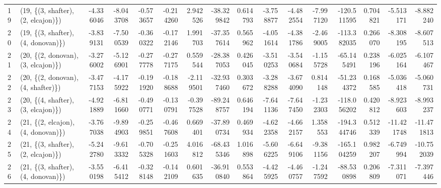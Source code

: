 \begin{tabular}{llrrrrrrrrrrrrrr}
19 &  (19, \{(3, shafter), (2, elcajon)\}) & -4.336046 &  -8.043708 &  -0.573657 & -0.214260 &  2.942526 &  -38.329842 &  0.614793 &  -3.758877 &  -4.482554 & -7.997120 & -120.511595 &  0.704821 &  -5.513171 &  -8.882240 \\
20 &  (19, \{(3, shafter), (4, donovan)\}) & -3.839131 &  -7.500539 &  -0.360322 & -0.172146 &  1.991703 &  -37.357614 &  0.565962 &  -4.051614 &  -4.381786 & -2.469005 & -113.382035 &  0.266070 &  -8.308195 &  -8.607513 \\
21 &  (20, \{(2, donovan), (3, elcajon)\}) & -3.276002 &  -5.126901 &  -0.277778 & -0.277175 &  0.559544 &  -28.387053 &  0.426045 &  -3.510253 &  -3.540684 & -1.155728 &  -65.145491 &  0.238196 &  -6.025164 &  -6.107467 \\
22 &  (20, \{(2, donovan), (4, shafter)\}) & -3.477153 &  -4.175922 &  -0.191920 & -0.188688 & -2.119501 &  -32.937460 &  0.303672 &  -3.288288 &  -3.674090 &  0.814148 &  -51.234372 &  0.168585 &  -5.036418 &  -5.060731 \\
23 &  (20, \{(4, shafter), (3, elcajon)\}) & -4.921889 &  -6.811660 &  -0.490771 & -0.130791 & -0.397528 &  -89.248757 &  0.646194 &  -7.641136 &  -7.647450 & -1.232303 & -118.056202 &  0.420812 &  -8.923603 &  -8.993237 \\
24 &  (21, \{(2, elcajon), (4, donovan)\}) & -3.767038 &  -9.894903 &  -0.259851 & -0.467608 &  0.669401 &  -37.890734 &  0.469934 &  -4.622358 &  -4.662157 &  1.358553 & -194.344746 &  0.512339 & -11.421748 & -11.471813 \\
25 &  (21, \{(3, shafter), (2, elcajon)\}) & -5.242780 &  -9.613332 &  -0.705328 & -0.251603 &  4.016812 &  -68.435346 &  1.016898 &  -5.606225 &  -6.649106 & -9.381156 & -165.104259 &  0.982207 &  -6.749994 & -10.752039 \\
26 &  (21, \{(3, shafter), (4, donovan)\}) & -3.550198 &  -6.415412 &  -0.328148 & -0.142109 &  0.601635 &  -36.910840 &  0.553864 &  -4.425925 &  -4.460757 & -1.247592 &  -88.530898 &  0.206809 &  -7.311071 &  -7.397446 \\
\bottomrule
\end{tabular}
